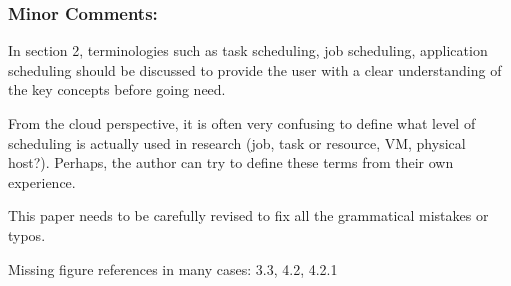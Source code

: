 

\subsubsection{Minor Comments:}

In section 2, terminologies such as task scheduling, job scheduling,
application scheduling should be discussed to provide the user with a
clear understanding of the key concepts before going need. 


From the
cloud perspective, it is often very confusing to define what level of
scheduling is actually used in research (job, task or resource, VM,
physical host?). Perhaps, the author can try to define these terms
from their own experience.


This paper needs to be carefully revised to fix all the grammatical
mistakes or typos.


Missing figure references in many cases: 3.3, 4.2, 4.2.1


